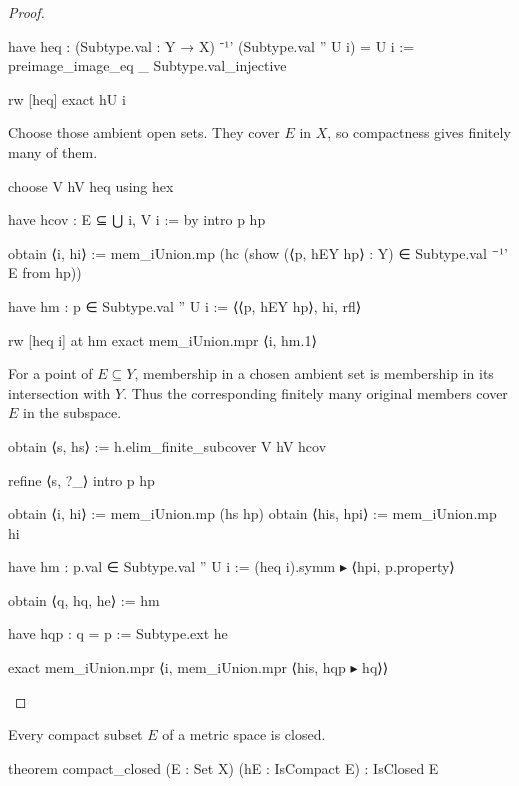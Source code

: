 \begin{proof}
\begin{lean}
        have heq : (Subtype.val : Y → X) ⁻¹' (Subtype.val '' U i) = U i :=
          preimage_image_eq _ Subtype.val_injective

        rw [heq]
        exact hU i
  \end{lean}

  Choose those ambient open sets.
  They cover $E$ in $X$, so compactness gives finitely many of them.

  \begin{lean}
    choose V hV heq using hex

    have hcov : E ⊆ ⋃ i, V i := by
      intro p hp

      obtain ⟨i, hi⟩ := mem_iUnion.mp (hc (show (⟨p, hEY hp⟩ : Y) ∈ Subtype.val ⁻¹' E from hp))

      have hm : p ∈ Subtype.val '' U i := ⟨⟨p, hEY hp⟩, hi, rfl⟩

      rw [heq i] at hm
      exact mem_iUnion.mpr ⟨i, hm.1⟩
  \end{lean}

  For a point of $E\subseteq Y$, membership in a chosen ambient set is membership in its
  intersection with $Y$.
  Thus the corresponding finitely many original members cover $E$ in the subspace.

  \begin{lean}
    obtain ⟨s, hs⟩ := h.elim_finite_subcover V hV hcov

    refine ⟨s, ?_⟩
    intro p hp

    obtain ⟨i, hi⟩ := mem_iUnion.mp (hs hp)
    obtain ⟨his, hpi⟩ := mem_iUnion.mp hi

    have hm : p.val ∈ Subtype.val '' U i := (heq i).symm ▸ ⟨hpi, p.property⟩

    obtain ⟨q, hq, he⟩ := hm

    have hqp : q = p := Subtype.ext he

    exact mem_iUnion.mpr ⟨i, mem_iUnion.mpr ⟨his, hqp ▸ hq⟩⟩
  \end{lean}

\end{proof}

\begin{proposition}
  \label{an1:thm:compact-set-is-closed}
  Every compact subset $E$ of a metric space is closed.

  \begin{lean}
    theorem compact_closed (E : Set X) (hE : IsCompact E) : IsClosed E
  \end{lean}
\end{proposition}

